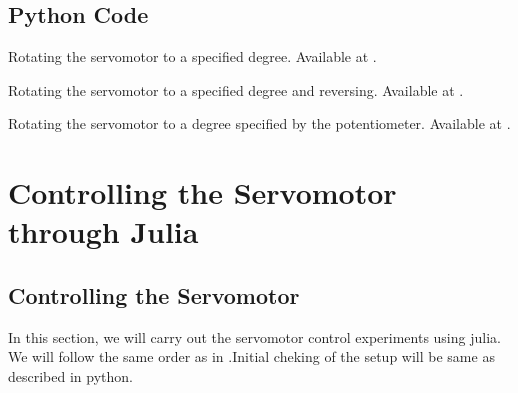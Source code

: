 \subsection{Python Code}
\lstset{style=mystyle}
\label{sec:servo-python-code}

\begin{pycode}
   {Rotating
    the servomotor to a specified degree.  Available at
    .}
  \label{py:servo-init}
  
\end{pycode}

\begin{pycode}
   {Rotating 
    the servomotor to a specified degree and reversing.  Available at
    .}
  \label{py:servo-reverse}
  
\end{pycode}

\begin{pycode}
  \label{sci:servo-loop}
  
\end{pycode}

\begin{pycode}
   {Rotating the servomotor to a degree specified by
    the potentiometer.  Available at .}
  \label{py:servo-pot}
  
\end{pycode}

\section{Controlling the Servomotor through Julia}
\subsection{Controlling the Servomotor}
\label{sec:servo-julia}
In this section, we will carry out the servomotor control experiments
using julia.  We will follow the same order as in
.Initial cheking of the setup will be same as
described in python.

